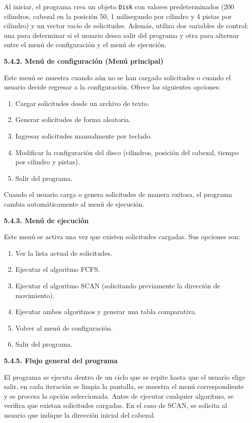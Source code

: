 \documentclass[14pt,letterpaper]{extarticle}
\begin{document}
Al iniciar, el programa crea un objeto \texttt{Disk} con valores predeterminados (200 cilindros, cabezal en la posición 50, 1 milisegundo por cilindro y 4 pistas por cilindro) y un vector vacío de solicitudes. Además, utiliza dos variables de control: una para determinar si el usuario desea salir del programa y otra para alternar entre el menú de configuración y el menú de ejecución.

\textbf{5.4.2. Menú de configuración (Menú principal)}

Este menú se muestra cuando aún no se han cargado solicitudes o cuando el usuario decide regresar a la configuración. Ofrece las siguientes opciones:

\begin{enumerate}
    \item Cargar solicitudes desde un archivo de texto.
    \item Generar solicitudes de forma aleatoria.
    \item Ingresar solicitudes manualmente por teclado.
    \item Modificar la configuración del disco (cilindros, posición del cabezal, tiempo por cilindro y pistas).
    \item Salir del programa.
\end{enumerate}

Cuando el usuario carga o genera solicitudes de manera exitosa, el programa cambia automáticamente al menú de ejecución.

\textbf{5.4.3. Menú de ejecución}

Este menú se activa una vez que existen solicitudes cargadas. Sus opciones son:

\begin{enumerate}
    \item Ver la lista actual de solicitudes.
    \item Ejecutar el algoritmo FCFS.
    \item Ejecutar el algoritmo SCAN (solicitando previamente la dirección de movimiento).
    \item Ejecutar ambos algoritmos y generar una tabla comparativa.
    \item Volver al menú de configuración.
    \item Salir del programa.
\end{enumerate}

\textbf{5.4.5. Flujo general del programa}

El programa se ejecuta dentro de un ciclo que se repite hasta que el usuario elige salir, en cada iteración se limpia la pantalla, se muestra el menú correspondiente y se procesa la opción seleccionada. Antes de ejecutar cualquier algoritmo, se verifica que existan solicitudes cargadas. En el caso de SCAN, se solicita al usuario que indique la dirección inicial del cabezal.
\end{document}
